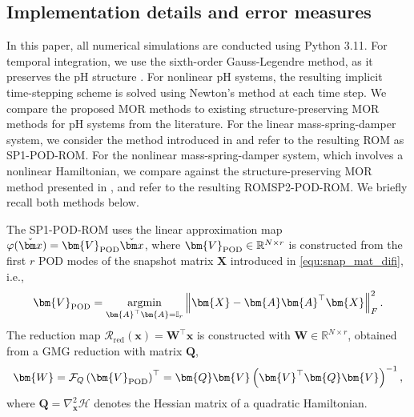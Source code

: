 \documentclass{article}
\newcommand{\argmin}{ \mathop{ \mathrm{argmin} } }
\newcommand{\bmA}{\bm{A}}
\newcommand{\bmV}{\bm{V}}
\newcommand{\bmW}{\bm{W}}
\newcommand{\bmQ}{\bm{Q}}
\newcommand{\bmX}{\bm{X}}
\newcommand{\R}{\mathbb{R}}
\newcommand{\curlyH}{\mathcal{H}}
\newcommand{\statex}{{\bm x}}
\newcommand{\stateRed}{\check{\bm x}}
\newcommand{\FOMsize}{N}
\newcommand{\ROMsize}{r}
\newcommand{\approxfunc}{\varphi}
\newcommand{\matfunc}{\mathcal{F}}
\newcommand{\VPOD}{\bmV_{\rm POD}}
\newcommand{\pH}{\textsf{pH}\xspace}
\newcommand{\GMG}{\textsf{GMG}\xspace}
\newcommand{\POD}{\textsf{POD}\xspace}
\newcommand{\ROM}{\textsf{ROM}\xspace}
\newcommand{\MOR}{\textsf{MOR}\xspace}
\newcommand{\SPQuad}{\textsf{SP2}\xspace}
\newcommand{\SPLin}{\textsf{SP1}\xspace}
\begin{document}
\subsection{Implementation details and error measures}
\label{subsec:Num_imp}

In this paper, all numerical simulations are conducted using Python 3.11. 
For temporal integration, we use the sixth-order Gauss-Legendre method, as it preserves the \pH structure \cite{kotyczka2018discrete}.  
For nonlinear \pH systems, the resulting implicit time-stepping scheme is solved using Newton's method at each time step.
We compare the proposed \MOR methods to existing structure-preserving \MOR methods for \pH systems from the literature. For the linear mass-spring-damper system, we consider the method introduced in \cite{schulze2023structure} and refer to the resulting \ROM as \SPLin-\POD-\ROM. 
For the nonlinear mass-spring-damper system, which involves a nonlinear Hamiltonian, we compare against the structure-preserving \MOR method presented in \cite{chaturantabut2016structure}, and refer to the resulting \ROM \SPQuad-\POD-\ROM. 
We briefly recall both methods below. 

The \SPLin-\POD-\ROM uses the linear approximation map $\approxfunc(\stateRed)=\VPOD\stateRed$, where $\VPOD\in\R^{\FOMsize\times\ROMsize}$ is constructed from the first $r$ \POD modes of the snapshot matrix $\bmX$ introduced in \eqref{equ:snap_mat_difi}, i.e.,
\begin{align}
	\label{equ:const_Lin_POD}
	\VPOD= \argmin_{\bmA^{\top}\bmA=\mathbb{I}_{\ROMsize}}
	\left\|
	\bmX - \bmA\bmA^{\top}\bmX
	\right\|^2_{F}.
\end{align}
The reduction map $\mathcal{R}_{\text{red}}(\statex) = \bmW^\top\statex$ is constructed with $\bmW\in\R^{\FOMsize\times\ROMsize}$, obtained from a \GMG reduction with matrix $\bmQ$, 
\begin{align}
	\label{equ:const_Lin_POD_red}
	\bmW = \matfunc_{Q}\left(\VPOD\right)^{\top}
	=
	\bmQ\bmV\left(\bmV^{\top}\bmQ\bmV\right)^{-1},
\end{align}
 where $\bmQ=\nabla_{\statex}^{2}\curlyH$ denotes the Hessian matrix of a quadratic Hamiltonian.
 
\end{document}
